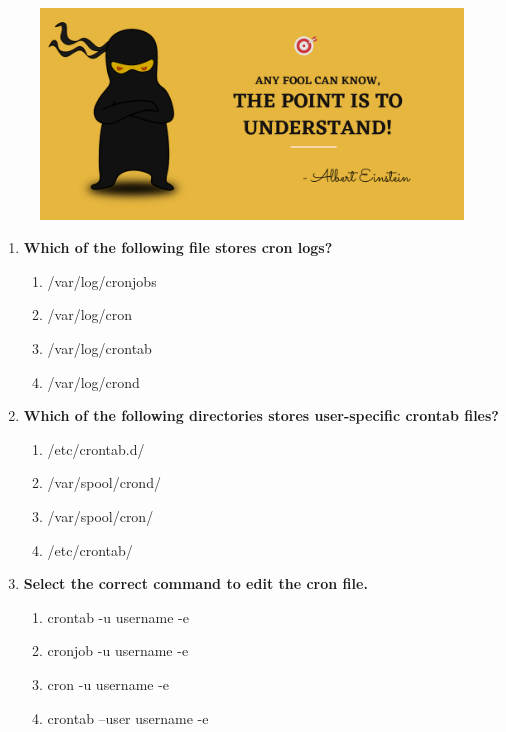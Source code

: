 \setlength{\columnsep}{3pt}
\begin{flushleft}
	
	\paragraph{}
	\bigskip
	
	\begin{figure}[h!]
		\centering
		\includegraphics[scale=.2]{content/practise.jpg}
	\end{figure}	
	\begin{enumerate}
		
		\item \textbf{Which of the following file stores cron logs?}
		\begin{enumerate}[label=(\alph*)]
			\item /var/log/cronjobs
			\item /var/log/cron %
			\item /var/log/crontab
			\item /var/log/crond
		\end{enumerate}
		\bigskip
		\bigskip
		
		\item \textbf{Which of the following directories stores user-specific crontab files?}
		\begin{enumerate}[label=(\alph*)]
			\item /etc/crontab.d/
			\item /var/spool/crond/
			\item /var/spool/cron/  %
			\item /etc/crontab/
		\end{enumerate}
		\bigskip
		\bigskip	
		
		\item \textbf{Select the correct command to edit the cron file.}
		\begin{enumerate}[label=(\alph*)]
			\item crontab -u username -e %
			\item cronjob -u username -e
			\item cron -u username -e
			\item crontab --user username -e
		\end{enumerate}
		\bigskip
		\bigskip	


\end{enumerate}
\end{flushleft}
